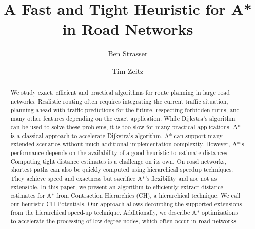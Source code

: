 \documentclass[a4paper,USenglish,cleveref, autoref, thm-restate]{lipics-v2019}
\title{A Fast and Tight Heuristic for A* in Road Networks}
\author{Ben Strasser}{Germany}{academia@ben-strasser.net}{}{}
\author{Tim Zeitz}{Karlsruhe Institute of Technology, Germany}{tim.zeitz@kit.edu}{https://orcid.org/0000-0003-4746-3582}{}
\begin{document}
\maketitle


\begin{abstract}
We study exact, efficient and practical algorithms for route planning in large road networks.
Realistic routing often requires integrating the current traffic situation, planning ahead with traffic predictions for the future, respecting forbidden turns, and many other features depending on the exact application.
While Dijkstra's algorithm can be used to solve these problems, it is too slow for many practical applications.
A* is a classical approach to accelerate Dijkstra's algorithm.
A* can support many extended scenarios without much additional implementation complexity.
However, A*'s performance depends on the availability of a good heuristic to estimate distances.
Computing tight distance estimates is a challenge on its own.
On road networks, shortest paths can also be quickly computed using hierarchical speedup techniques.
They achieve speed and exactness but sacrifice A*'s flexibility and are not as extensible.
In this paper, we present an algorithm to efficiently extract distance estimates for A* from Contraction Hierarchies (CH), a hierarchical technique.
We call our heuristic CH-Potentials.
Our approach allows decoupling the supported extensions from the hierarchical speed-up technique.
Additionally, we describe A* optimizations to accelerate the processing of low degree nodes, which often occur in road networks.
\end{abstract}

\newpage
\end{document}
